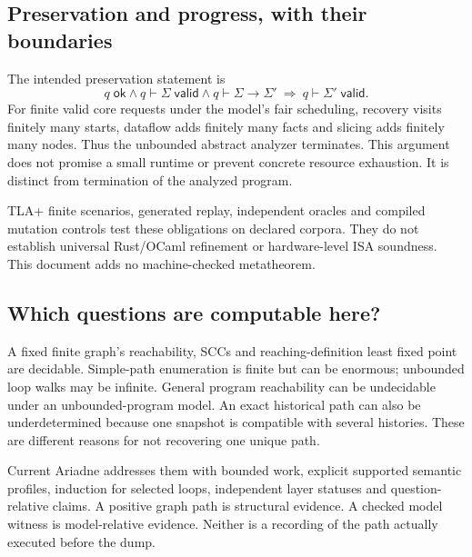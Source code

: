\documentclass[11pt,a4paper]{article}
\newcommand{\ty}[1]{\mathsf{#1}}
\begin{document}
\subsection{Preservation and progress, with their boundaries}
The intended preservation statement is
\[
 q\;\ty{ok}\land q\vdash\Sigma\;\ty{valid}
 \land q\vdash\Sigma\longrightarrow\Sigma'
 \ \Longrightarrow\ q\vdash\Sigma'\;\ty{valid}.
\]
For finite valid core requests under the model's fair scheduling, recovery
visits finitely many starts, dataflow adds finitely many facts and slicing adds
finitely many nodes. Thus the unbounded abstract analyzer terminates. This
argument does not promise a small runtime or prevent concrete resource
exhaustion. It is distinct from termination of the analyzed program.

TLA+ finite scenarios, generated replay, independent oracles and compiled
mutation controls test these obligations on declared corpora. They do not
establish universal Rust/OCaml refinement or hardware-level ISA soundness.
This document adds no machine-checked metatheorem.

\subsection{Which questions are computable here?}
A fixed finite graph's reachability, SCCs and reaching-definition least fixed
point are decidable. Simple-path enumeration is finite but can be enormous;
unbounded loop walks may be infinite. General program reachability can be
undecidable under an unbounded-program model. An exact historical path can
also be underdetermined because one snapshot is compatible with several
histories. These are different reasons for not recovering one unique path.

Current Ariadne addresses them with bounded work, explicit supported semantic
profiles, induction for selected loops, independent layer statuses and
question-relative claims. A positive graph path is structural evidence.
A checked model witness is model-relative evidence. Neither is a recording
of the path actually executed before the dump.

\appendix
\clearpage
\end{document}
